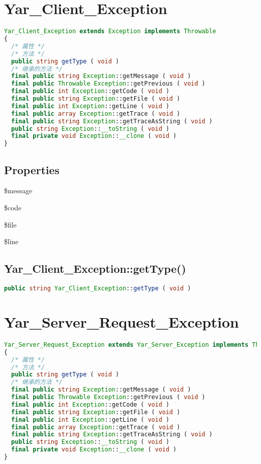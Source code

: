 \chapter{Yar\_Client\_Exception}



\begin{lstlisting}[language=PHP]
Yar_Client_Exception extends Exception implements Throwable
{
  /* 属性 */
  /* 方法 */
  public string getType ( void )
  /* 继承的方法 */
  final public string Exception::getMessage ( void )
  final public Throwable Exception::getPrevious ( void )
  final public int Exception::getCode ( void )
  final public string Exception::getFile ( void )
  final public int Exception::getLine ( void )
  final public array Exception::getTrace ( void )
  final public string Exception::getTraceAsString ( void )
  public string Exception::__toString ( void )
  final private void Exception::__clone ( void )
}
\end{lstlisting}


\section{Properties}

\begin{compactitem}
\item \$message
\item \$code
\item \$file
\item \$line
\end{compactitem}

\section{Yar\_Client\_Exception::getType()}


\begin{lstlisting}[language=PHP]
public string Yar_Client_Exception::getType ( void )
\end{lstlisting}


\chapter{Yar\_Server\_Request\_Exception}




\begin{lstlisting}[language=PHP]
Yar_Server_Request_Exception extends Yar_Server_Exception implements Throwable
{
  /* 属性 */
  /* 方法 */
  public string getType ( void )
  /* 继承的方法 */
  final public string Exception::getMessage ( void )
  final public Throwable Exception::getPrevious ( void )
  final public int Exception::getCode ( void )
  final public string Exception::getFile ( void )
  final public int Exception::getLine ( void )
  final public array Exception::getTrace ( void )
  final public string Exception::getTraceAsString ( void )
  public string Exception::__toString ( void )
  final private void Exception::__clone ( void )
}
\end{lstlisting}


